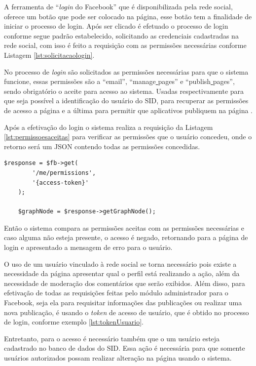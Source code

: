 A ferramenta de ``\textit{login} do Facebook'' que é disponibilizada pela rede social, oferece um botão que pode ser colocado na página, esse botão tem a finalidade de iniciar o processo de login. Após ser clicado é efetuado o processo de login conforme segue padrão estabelecido, solicitando as credenciais cadastradas na rede social, com isso é feito a requisição com as permissões necessárias conforme Listagem \ref{lst:solicitacaologin}.

No processo de \textit{login} são solicitados as permissões necessárias para que o sistema funcione, essas permissões são a “email”, “manage\underline{{ }}pages” e “publish\underline{{ }}pages”, sendo obrigatório o aceite para acesso ao sistema. Usadas respectivamente para que seja possível a identificação do usuário do SID, para recuperar as permissões de acesso a página e a última para permitir que aplicativos publiquem na página \cite{facebook2018a}.

Após a efetivação do login o sistema realiza a requisição da Listagem \ref{lst:permissoesaceitas} para verificar as permissões que o usuário concedeu, onde o retorno será um JSON contendo todas as permissões concedidas.

\begin{lstlisting}[caption={Permissões concedidas},label={lst:permissoesaceitas}]
  	$response = $fb->get(
    	'/me/permissions',
		'{access-token}'
	);
	
	$graphNode = $response->getGraphNode();
\end{lstlisting}

Então o sistema compara as permissões aceitas com as permissões necessárias e caso alguma não esteja presente, o acesso é negado, retornando para a página de login e apresentado a mensagem de erro para o usuário.

O uso de um usuário vinculado à rede social se torna necessário pois existe a necessidade da página apresentar qual o perfil está realizando a ação, além da necessidade de moderação dos comentários que serão exibidos.  Além disso, para efetivação de todas as requisições feitas pelo módulo administrador para o Facebook, seja ela para requisitar informações das publicações ou realizar uma nova publicação, é usando o \textit{token} de acesso de usuário, que é obtido no processo de login, conforme exemplo \ref{lst:tokenUsuario}.

Entretanto, para o acesso é necessário também que o um usuário esteja cadastrado no banco de dados do SID. Essa ação é necessária para que somente usuários autorizados possam realizar alteração na página usando o sistema.

